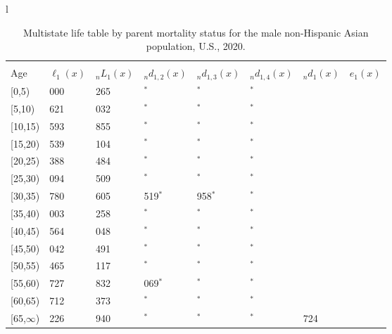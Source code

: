 \documentclass[
]{article}
\begin{document}
\begin{table}
\caption{\label{tab:table-nhasian-male}Multistate life table by parent mortality status for the male non-Hispanic Asian population, U.S., 2020.}

\centering
\fontsize{9}{11}\selectfont
\begin{tabular}[t]{l}
\hline
\begin{tabular}{>{\raggedright\arraybackslash}p{.45in}>{\raggedleft\arraybackslash}p{.65in}>{\raggedleft\arraybackslash}p{.65in}>{\raggedleft\arraybackslash}p{.65in}>{\raggedleft\arraybackslash}p{.65in}>{\raggedleft\arraybackslash}p{.65in}>{\raggedleft\arraybackslash}p{.65in}>{\raggedleft\arraybackslash}p{.65in}}
\toprule
\multicolumn{1}{c}{ } & \multicolumn{7}{c}{(1) Lost neither} \\
\cmidrule(l{3pt}r{3pt}){2-8}
Age & $\ell_{1}(x)$ & ${}_nL_{1}(x)$ & ${}_nd_{1,2}(x)$ & ${}_nd_{1,3}(x)$ & ${}_nd_{1,4}(x)$ & ${}_nd_{1}(x)$ & $e_{1}(x)$\\
\midrule
{}[0,5) & 100 000 & 498 265 & 0$^{*}$ & 0$^{*}$ & 0$^{*}$ & 379 & 49\\
{}[5,10) & 99 621 & 498 032 & 0$^{*}$ & 0$^{*}$ & 0$^{*}$ & 28 & 44\\
{}[10,15) & 99 593 & 497 855 & 0$^{*}$ & 0$^{*}$ & 0$^{*}$ & 54 & 39\\
{}[15,20) & 99 539 & 478 104 & 0$^{*}$ & 0$^{*}$ & 0$^{*}$ & 151 & 34\\
{}[20,25) & 99 388 & 487 484 & 0$^{*}$ & 0$^{*}$ & 0$^{*}$ & 294 & 29\\
\addlinespace
{}[25,30) & 99 094 & 472 509 & 0$^{*}$ & 0$^{*}$ & 0$^{*}$ & 314 & 24\\
{}[30,35) & 98 780 & 402 605 & 10 519$^{*}$ & 2 958$^{*}$ & 0$^{*}$ & 299 & 20\\
{}[35,40) & 85 003 & 425 258 & 0$^{*}$ & 0$^{*}$ & 0$^{*}$ & 439 & 16\\
{}[40,45) & 84 564 & 376 048 & 0$^{*}$ & 0$^{*}$ & 0$^{*}$ & 523 & 11\\
{}[45,50) & 84 042 & 260 491 & 0$^{*}$ & 0$^{*}$ & 0$^{*}$ & 576 & 8\\
\addlinespace
{}[50,55) & 83 465 & 207 117 & 0$^{*}$ & 0$^{*}$ & 0$^{*}$ & 738 & 5\\
{}[55,60) & 82 727 & 174 832 & 12 069$^{*}$ & 0$^{*}$ & 0$^{*}$ & 946 & 3\\
{}[60,65) & 69 712 & 55 373 & 0$^{*}$ & 0$^{*}$ & 0$^{*}$ & 485 & 1\\
{}[65,$\infty$) & 69 226 & 34 940 & 0$^{*}$ & 0$^{*}$ & 0$^{*}$ & 1 724 & 0\\

\end{tabular}
\end{tabular}
\end{table}
\end{document}
